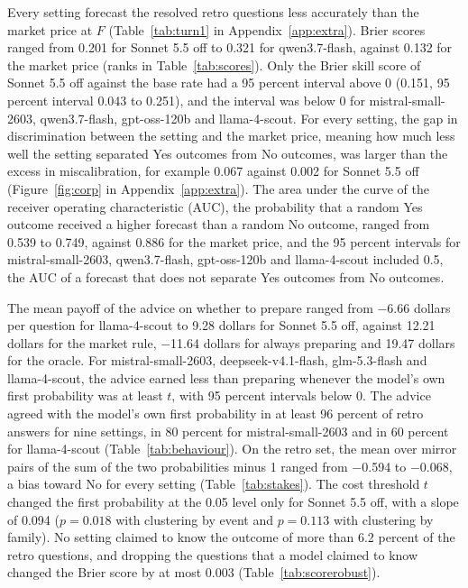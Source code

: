 \documentclass[11pt]{article}
\begin{document}
Every setting forecast the resolved retro questions less accurately than the market price at $F$ (Table~\ref{tab:turn1} in Appendix~\ref{app:extra}). Brier scores ranged from 0.201 for Sonnet 5.5 off to 0.321 for qwen3.7-flash, against 0.132 for the market price (ranks in Table~\ref{tab:scores}). Only the Brier skill score of Sonnet 5.5 off against the base rate had a 95 percent interval above 0 (0.151, 95 percent interval 0.043 to 0.251), and the interval was below 0 for mistral-small-2603, qwen3.7-flash, gpt-oss-120b and llama-4-scout. For every setting, the gap in discrimination between the setting and the market price, meaning how much less well the setting separated Yes outcomes from No outcomes, was larger than the excess in miscalibration, for example 0.067 against 0.002 for Sonnet 5.5 off (Figure~\ref{fig:corp} in Appendix~\ref{app:extra}). The area under the curve of the receiver operating characteristic (AUC), the probability that a random Yes outcome received a higher forecast than a random No outcome, ranged from 0.539 to 0.749, against 0.886 for the market price, and the 95 percent intervals for mistral-small-2603, qwen3.7-flash, gpt-oss-120b and llama-4-scout included 0.5, the AUC of a forecast that does not separate Yes outcomes from No outcomes.

The mean payoff of the advice on whether to prepare ranged from $-$6.66 dollars per question for llama-4-scout to 9.28 dollars for Sonnet 5.5 off, against 12.21 dollars for the market rule, $-$11.64 dollars for always preparing and 19.47 dollars for the oracle. For mistral-small-2603, deepseek-v4.1-flash, glm-5.3-flash and llama-4-scout, the advice earned less than preparing whenever the model's own first probability was at least $t$, with 95 percent intervals below 0. The advice agreed with the model's own first probability in at least 96 percent of retro answers for nine settings, in 80 percent for mistral-small-2603 and in 60 percent for llama-4-scout (Table~\ref{tab:behaviour}). On the retro set, the mean over mirror pairs of the sum of the two probabilities minus 1 ranged from $-$0.594 to $-$0.068, a bias toward No for every setting (Table~\ref{tab:stakes}). The cost threshold $t$ changed the first probability at the 0.05 level only for Sonnet 5.5 off, with a slope of 0.094 ($p=0.018$ with clustering by event and $p=0.113$ with clustering by family). No setting claimed to know the outcome of more than 6.2 percent of the retro questions, and dropping the questions that a model claimed to know changed the Brier score by at most 0.003 (Table~\ref{tab:scorerobust}).
\end{document}
